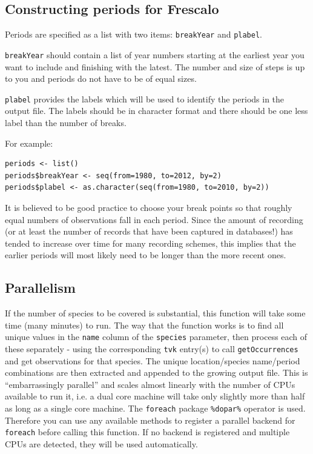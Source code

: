 \documentclass{article}
\begin{document}
\subsection{Constructing periods for Frescalo}
Periods are specified as a list with two
items: \texttt{breakYear} and \texttt{plabel}. 

\texttt{breakYear} should contain a
list of year numbers starting at the earliest year you want to include and
finishing with the latest. The number and size of steps is up to you and
periods do not have to be of equal sizes. 

\texttt{plabel} provides the labels
which will be used to identify the periods in the output file. The labels
should be in character format and there should be one less label than the
number of breaks.
 
For example:
\begin{verbatim}
periods <- list()
periods$breakYear <- seq(from=1980, to=2012, by=2)
periods$plabel <- as.character(seq(from=1980, to=2010, by=2))
\end{verbatim}
 
It is believed to be good practice to choose your break points so that
roughly equal numbers of observations fall in each period. Since the amount
of recording (or at least the number of records that have been captured in
databases!) has tended to increase over time for many recording schemes, this
implies that the earlier periods will most likely need to be longer than the
more recent ones.

\subsection{Parallelism}
If the number of species to be covered is 
substantial, this function will take some time (many minutes) to run. The way
that the function works is to find all unique values in the \texttt{name} 
column of the \texttt{species} parameter, then process each of these separately
- using the corresponding \texttt{tvk} entry(s) to call 
\texttt{getOccurrences} and get observations for that species. The
unique location/species name/period combinations are then extracted and
appended to the growing output file. This is ``embarrassingly parallel'' and
scales almost linearly with the number of CPUs available to run it, i.e. a
dual core machine will take only slightly more than half as long as a single
core machine. The \texttt{foreach} package \texttt{\%dopar\%} operator is used.
Therefore you can use any available methods to register a parallel backend
for \texttt{foreach} before calling this function. If no backend is registered
and multiple CPUs are detected, they will be used automatically.


\end{document}
